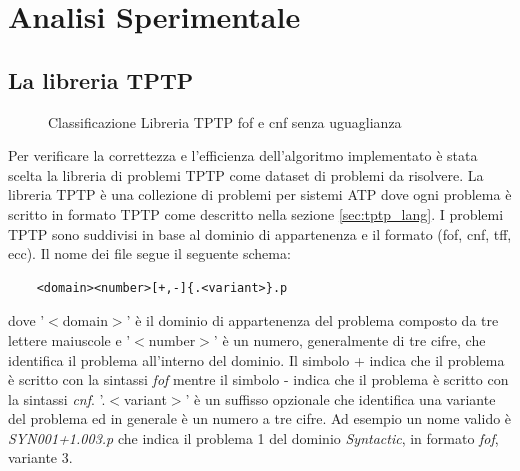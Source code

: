 \documentclass[./main.tex]{subfiles}
\begin{document}
\chapter{Analisi Sperimentale}
\section{La libreria TPTP}
\begin{figure}[h]
    \centering
    \caption{Classificazione Libreria TPTP fof e cnf senza uguaglianza}
    \label{fig:classificazione_tptp}
\end{figure}

Per verificare la correttezza e l'efficienza dell'algoritmo implementato è stata scelta 
la libreria di problemi TPTP \cite{tptpLib} come dataset di problemi da risolvere. 
La libreria TPTP è una collezione di problemi per sistemi ATP dove ogni problema è scritto in formato
TPTP come descritto nella sezione \ref{sec:tptp_lang}.
I problemi TPTP sono suddivisi in base al dominio di appartenenza e il formato (fof, cnf, tff, ecc).
Il nome dei file segue il seguente schema:
\begin{verbatim}
    <domain><number>[+,-]{.<variant>}.p
\end{verbatim}

dove '$<$domain$>$' è il dominio di appartenenza del problema composto da tre lettere maiuscole e
'$<$number$>$' è un numero, generalmente di tre cifre, che identifica il problema all'interno del dominio.
Il simbolo + indica che il problema è scritto con la sintassi \textit{fof} mentre il simbolo - indica
che il problema è scritto con la sintassi \textit{cnf}. '.$<$variant$>$' è un suffisso opzionale che
identifica una variante del problema ed in generale è un numero a tre cifre.
Ad esempio un nome valido è \textit{SYN001+1.003.p} che indica il problema 1 del dominio \textit{Syntactic},
in formato \textit{fof}, variante 3. 
\end{document}
